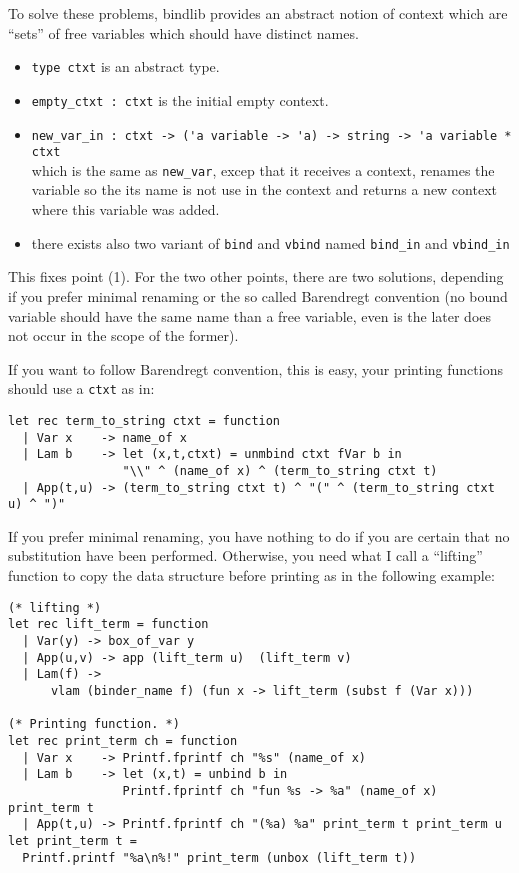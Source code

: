 \documentclass[11pt]{article}
\begin{document}
To solve these problems, bindlib provides an abstract notion of context
 which are ``sets'' of free variables which should have
 distinct names.
\begin{itemize}
\item\verb#type ctxt# is  an abstract type.
\item\verb#empty_ctxt : ctxt# is the initial empty context.
\item\verb#new_var_in : ctxt -> ('a variable -> 'a) -> string -> 'a variable * ctxt#\\
  which is the same as \verb#new_var#, excep that it receives a
  context, renames the variable so the its name is not use in the
  context and returns a new context where this variable was added.
\item there exists also two variant of \verb#bind# and \verb#vbind#
  named \verb#bind_in# and \verb#vbind_in#
\end{itemize}

This fixes point (1). For the two other points, there are two solutions,
depending if you prefer minimal renaming or the so called Barendregt
convention (no bound variable should have the same name than a free
variable, even is the later does not occur in the scope of the
former).

If you want to follow Barendregt convention, this is easy, your
printing functions should use a \verb#ctxt# as in:

\begin{verbatim}
let rec term_to_string ctxt = function
  | Var x    -> name_of x
  | Lam b    -> let (x,t,ctxt) = unmbind ctxt fVar b in
                "\\" ^ (name_of x) ^ (term_to_string ctxt t)
  | App(t,u) -> (term_to_string ctxt t) ^ "(" ^ (term_to_string ctxt u) ^ ")"
\end{verbatim}

If you prefer minimal renaming, you have nothing to do if you are
certain that no substitution have been performed. Otherwise, you need
what I call a ``lifting'' function to copy the data structure before
printing as in the following example:

\begin{verbatim}
(* lifting *)
let rec lift_term = function
  | Var(y) -> box_of_var y
  | App(u,v) -> app (lift_term u)  (lift_term v)
  | Lam(f) ->
      vlam (binder_name f) (fun x -> lift_term (subst f (Var x)))

(* Printing function. *)
let rec print_term ch = function
  | Var x    -> Printf.fprintf ch "%s" (name_of x)
  | Lam b    -> let (x,t) = unbind b in
                Printf.fprintf ch "fun %s -> %a" (name_of x) print_term t
  | App(t,u) -> Printf.fprintf ch "(%a) %a" print_term t print_term u
let print_term t =
  Printf.printf "%a\n%!" print_term (unbox (lift_term t))
\end{verbatim}
\end{document}
